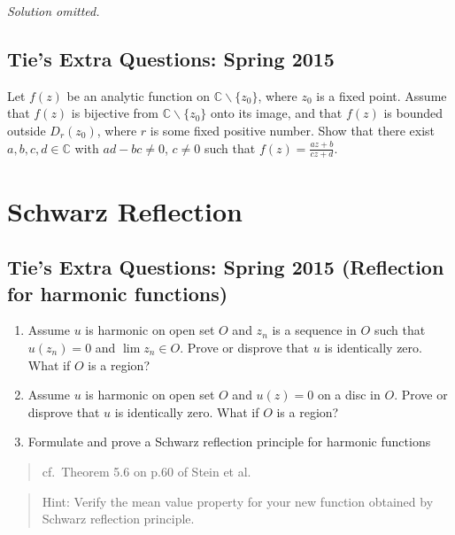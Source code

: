 \emph{Solution omitted.}

\hypertarget{ties-extra-questions-spring-2015-9}{%
\subsection{Tie's Extra Questions: Spring
2015}\label{ties-extra-questions-spring-2015-9}}

\begin{problem}[?]

Let \(f(z)\) be an analytic function on
\({\mathbb C} \backslash \{ z_0 \}\), where \(z_0\) is a fixed point.
Assume that \(f(z)\) is bijective from
\({\mathbb C} \backslash \{ z_0 \}\) onto its image, and that \(f(z)\)
is bounded outside \(D_r(z_0)\), where \(r\) is some fixed positive
number. Show that there exist \(a, b, c, d \in \mathbb C\) with
\(ad-bc \neq 0\), \(c \neq 0\) such that
\(\displaystyle f(z) = \frac{az + b}{cz + d}\).

\end{problem}

\hypertarget{schwarz-reflection}{%
\section{Schwarz Reflection}\label{schwarz-reflection}}

\hypertarget{ties-extra-questions-spring-2015-reflection-for-harmonic-functions}{%
\subsection{Tie's Extra Questions: Spring 2015 (Reflection for harmonic
functions)}\label{ties-extra-questions-spring-2015-reflection-for-harmonic-functions}}

\begin{problem}[?]

\begin{enumerate}
\def\labelenumi{(\arabic{enumi})}
\item
  Assume \(u\) is harmonic on open set \(O\) and \(z_n\) is a sequence
  in \(O\) such that \(u(z_n) = 0\) and \(\lim z_n \in O\). Prove or
  disprove that \(u\) is identically zero. What if \(O\) is a region?
\item
  Assume \(u\) is harmonic on open set \(O\) and \(u(z) = 0\) on a disc
  in \(O\). Prove or disprove that \(u\) is identically zero. What if
  \(O\) is a region?
\item
  Formulate and prove a Schwarz reflection principle for harmonic
  functions
\end{enumerate}

\begin{quote}
cf.~Theorem 5.6 on p.60 of Stein et al.
\end{quote}

\begin{quote}
Hint: Verify the mean value property for your new function obtained by
Schwarz reflection principle.
\end{quote}

\end{problem}


